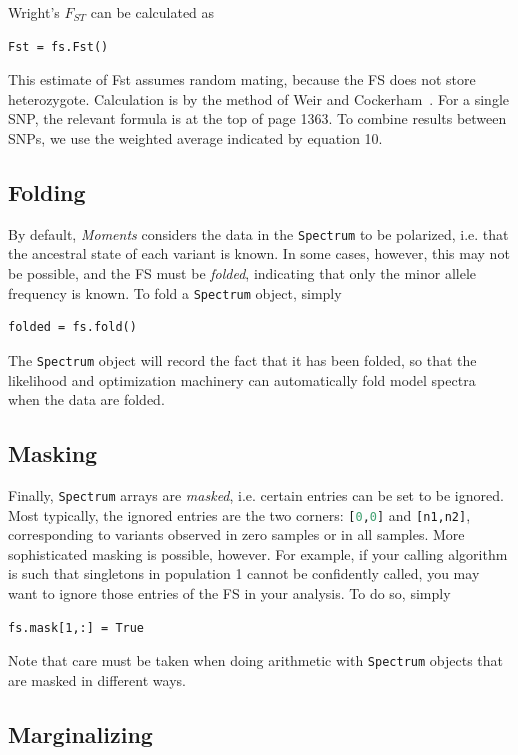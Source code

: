 \documentclass[12pt]{article}
\makeatletter
\newcommand{\py}[1]{\lstinline[language=Python, showstringspaces=False]@#1@}
\makeatother
\begin{document}
Wright's $F_{ST}$ can be calculated as
\begin{lstlisting}
Fst = fs.Fst()
\end{lstlisting}
This estimate of Fst assumes random mating, because the FS does not store heterozygote.
Calculation is by the method of Weir and Cockerham~\cite{bib:Weir1984}.
For a single SNP, the relevant formula is at the top of page 1363.
To combine results between SNPs, we use the weighted average indicated by equation 10.

\subsection{Folding}

By default, \textit{Moments} considers the data in the \py{Spectrum} to be polarized, i.e. that the ancestral state of each variant is known.
In some cases, however, this may not be possible, and the FS must be \emph{folded}, indicating that only the minor allele frequency is known.
To fold a \py{Spectrum} object, simply
\begin{lstlisting}
folded = fs.fold()
\end{lstlisting}
The \py{Spectrum} object will record the fact that it has been folded, so that the likelihood and optimization machinery can automatically fold model spectra when the data are folded.

\subsection{Masking}

Finally, \py{Spectrum} arrays are \emph{masked}, i.e. certain entries can be set to be ignored.
Most typically, the ignored entries are the two corners: \py{[0,0]} and \py{[n1,n2]}, corresponding to variants observed in zero samples or in all samples.
More sophisticated masking is possible, however.
For example, if your calling algorithm is such that singletons in population 1 cannot be confidently called, you may want to ignore those entries of the FS in your analysis.
To do so, simply
\begin{lstlisting}
fs.mask[1,:] = True
\end{lstlisting}
Note that care must be taken when doing arithmetic with \py{Spectrum} objects that are masked in different ways.

\subsection{Marginalizing}
\end{document}
